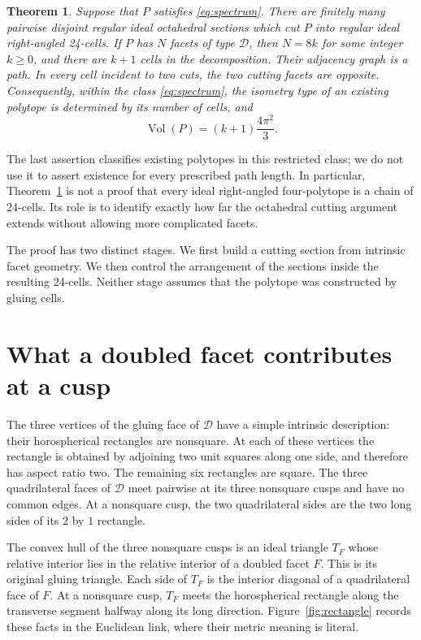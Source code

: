 \documentclass[11pt]{article}
\newtheorem{theorem}{Theorem}[section]
\theoremstyle{remark}
\newcommand{\Vol}{\operatorname{Vol}}
\newcommand{\DBL}{\mathcal D}
\begin{document}
\begin{theorem}\label{thm:main}
Suppose that $P$ satisfies \eqref{eq:spectrum}. There are finitely many
pairwise disjoint regular ideal octahedral sections which cut $P$ into
regular ideal right-angled 24-cells. If $P$ has $N$ facets of type
$\DBL$, then $N=8k$ for some integer $k\ge0$, and there are $k+1$
cells in the decomposition. Their adjacency graph is a path.
In every cell incident to two cuts, the two cutting facets are opposite.
Consequently, within the class \eqref{eq:spectrum}, the isometry type
of an existing polytope is determined by its number of cells, and
\[
 \Vol(P)=(k+1)\frac{4\pi^2}{3}.
\]
\end{theorem}

The last assertion classifies existing polytopes in this restricted
class; we do not use it to assert existence for every prescribed path
length. In particular, Theorem~\ref{thm:main} is not a proof that every
ideal right-angled four-polytope is a chain of 24-cells. Its role is to
identify exactly how far the octahedral cutting argument extends
without allowing more complicated facets.

The proof has two distinct stages. We first build a cutting section
from intrinsic facet geometry. We then control the arrangement of
the sections inside the resulting 24-cells. Neither stage assumes
that the polytope was constructed by gluing cells.

\section{What a doubled facet contributes at a cusp}

The three vertices of the gluing face of $\DBL$ have a simple
intrinsic description: their horospherical rectangles are nonsquare.
At each of these vertices the rectangle is obtained by adjoining
two unit squares along one side, and therefore has aspect ratio two.
The remaining six rectangles are square. The three quadrilateral
faces of $\DBL$ meet pairwise at its three nonsquare cusps and have
no common edges. At a nonsquare cusp, the two quadrilateral sides
are the two long sides of its $2$ by $1$ rectangle.

The convex hull of the three nonsquare cusps is an ideal triangle
$T_F$ whose relative interior lies in the relative interior of a
doubled facet $F$. This is its
original gluing triangle. Each side of $T_F$ is the interior diagonal
of a quadrilateral face of $F$. At a nonsquare cusp, $T_F$ meets
the horospherical rectangle along the transverse segment halfway
along its long direction. Figure~\ref{fig:rectangle} records these
facts in the Euclidean link, where their metric meaning is literal.
\end{document}
